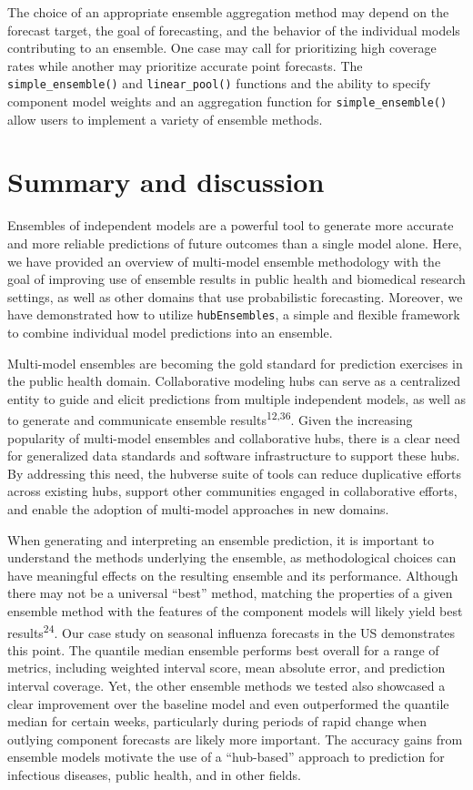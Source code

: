 \documentclass[
  letterpaper,
  DIV=11,
  numbers=noendperiod]{scrartcl}
\begin{document}
The choice of an appropriate ensemble aggregation method may depend on
the forecast target, the goal of forecasting, and the behavior of the
individual models contributing to an ensemble. One case may call for
prioritizing high coverage rates while another may prioritize accurate
point forecasts. The \texttt{simple\_ensemble()} and
\texttt{linear\_pool()} functions and the ability to specify component
model weights and an aggregation function for
\texttt{simple\_ensemble()} allow users to implement a variety of
ensemble methods.

\section{Summary and discussion}\label{sec-conclusions}

Ensembles of independent models are a powerful tool to generate more
accurate and more reliable predictions of future outcomes than a single
model alone. Here, we have provided an overview of multi-model ensemble
methodology with the goal of improving use of ensemble results in public
health and biomedical research settings, as well as other domains that
use probabilistic forecasting. Moreover, we have demonstrated how to
utilize \texttt{hubEnsembles}, a simple and flexible framework to
combine individual model predictions into an ensemble.

Multi-model ensembles are becoming the gold standard for prediction
exercises in the public health domain. Collaborative modeling hubs can
serve as a centralized entity to guide and elicit predictions from
multiple independent models, as well as to generate and communicate
ensemble results\textsuperscript{12,36}. Given the increasing popularity
of multi-model ensembles and collaborative hubs, there is a clear need
for generalized data standards and software infrastructure to support
these hubs. By addressing this need, the hubverse suite of tools can
reduce duplicative efforts across existing hubs, support other
communities engaged in collaborative efforts, and enable the adoption of
multi-model approaches in new domains.

When generating and interpreting an ensemble prediction, it is important
to understand the methods underlying the ensemble, as methodological
choices can have meaningful effects on the resulting ensemble and its
performance. Although there may not be a universal ``best'' method,
matching the properties of a given ensemble method with the features of
the component models will likely yield best results\textsuperscript{24}.
Our case study on seasonal influenza forecasts in the US demonstrates
this point. The quantile median ensemble performs best overall for a
range of metrics, including weighted interval score, mean absolute
error, and prediction interval coverage. Yet, the other ensemble methods
we tested also showcased a clear improvement over the baseline model and
even outperformed the quantile median for certain weeks, particularly
during periods of rapid change when outlying component forecasts are
likely more important. The accuracy gains from ensemble models motivate
the use of a ``hub-based'' approach to prediction for infectious
diseases, public health, and in other fields.
\end{document}
